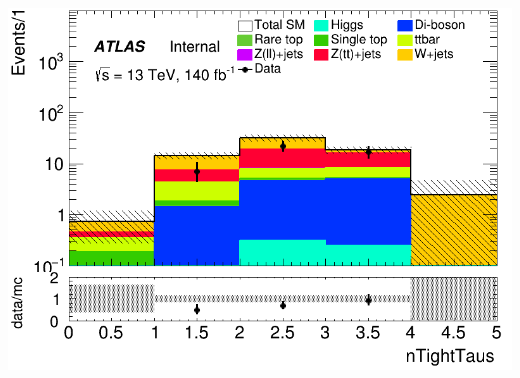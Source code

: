 \documentclass[usenames,dvipsnames]{beamer}
\begin{document}
\begin{frame}
\begin{minipage}{0.32\textwidth}
        \includegraphics[width=\textwidth]{graphics/HHH_met/HHH_met_nTightTaus.png}
    \end{minipage}
\end{frame}
\end{document}
